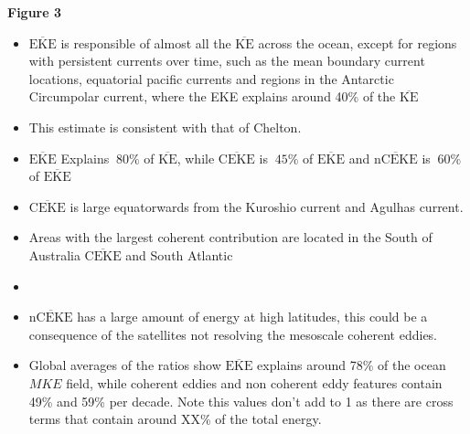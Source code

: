 \documentclass[draft,linenumbers]{agujournal2019}
\newcommand{\MKE}{\overline{\textrm{KE}}}
\newcommand{\MEKE}{\overline{\textrm{EKE}}}
\newcommand{\MCEKE}{\overline{\textrm{CEKE}}}
\newcommand{\MnCEKE}{\overline{\textrm{nCEKE}}}
\begin{document}
	\textbf{Figure 3}
	\begin{itemize}
		\item $\MEKE$ is responsible of almost all the $\MKE$ across the ocean, except for regions with persistent currents over time, such as the mean boundary current locations, equatorial pacific currents and regions in the Antarctic Circumpolar current, where the EKE explains around 40\% of the $\MKE$
		\item This estimate is consistent with that of Chelton.
		\item $\MEKE$ Explains $~80\%$ of $\MKE$, while $\MCEKE$ is $~45\%$ of $\MEKE$ and $\MnCEKE$  is $~60\%$ of $\MEKE$ 
		\item $\MCEKE$ is large equatorwards from the Kuroshio current and Agulhas current.
		\item Areas with the largest coherent contribution are located in the South of Australia $\MCEKE$ and South Atlantic
		\item 
		\item $\MnCEKE$ has a large amount of energy at high latitudes, this could be a consequence of the satellites not resolving the mesoscale coherent eddies. 
		\item Global averages of the ratios show $\MEKE$ explains around 78\% of the ocean $MKE$ field, while coherent eddies and non coherent eddy features contain 49\% and 59\% per decade. Note this values don't add to 1 as there are cross terms that contain around XX\% of the total energy.
	\end{itemize}
\end{document}
